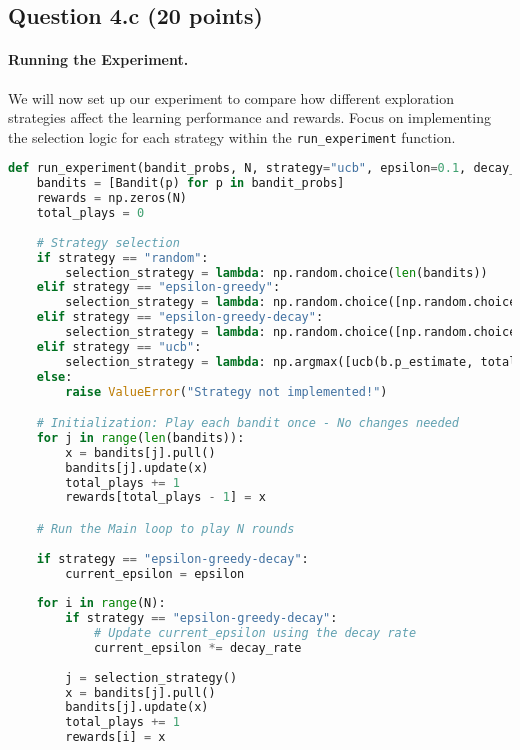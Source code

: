 \documentclass[12pt]{article}
\begin{document}
\subsection*{Question 4.c (20 points) } 
\paragraph{Running the Experiment.}
We will now set up our experiment to compare how different exploration strategies affect the learning performance and rewards. Focus on implementing the selection logic for each strategy within the \texttt{run\_experiment} function.
\begin{solution}
\begin{lstlisting}[language=Python]
def run_experiment(bandit_probs, N, strategy="ucb", epsilon=0.1, decay_rate=0.99):
    bandits = [Bandit(p) for p in bandit_probs]
    rewards = np.zeros(N)
    total_plays = 0
    
    # Strategy selection
    if strategy == "random":
        selection_strategy = lambda: np.random.choice(len(bandits))
    elif strategy == "epsilon-greedy":
        selection_strategy = lambda: np.random.choice([np.random.choice(len(bandits)), np.argmax([b.p_estimate for b in bandits])], p=[epsilon, 1-epsilon])
    elif strategy == "epsilon-greedy-decay":
        selection_strategy = lambda: np.random.choice([np.random.choice(len(bandits)), np.argmax([b.p_estimate for b in bandits])], p=[current_epsilon, 1-current_epsilon]) if np.random.random() < current_epsilon else np.argmax([b.p_estimate for b in bandits])
    elif strategy == "ucb":
        selection_strategy = lambda: np.argmax([ucb(b.p_estimate, total_plays, b.N) for b in bandits])
    else:
        raise ValueError("Strategy not implemented!")

    # Initialization: Play each bandit once - No changes needed
    for j in range(len(bandits)):
        x = bandits[j].pull()
        bandits[j].update(x)
        total_plays += 1
        rewards[total_plays - 1] = x

    # Run the Main loop to play N rounds 
    
    if strategy == "epsilon-greedy-decay":
        current_epsilon = epsilon
    
    for i in range(N):
        if strategy == "epsilon-greedy-decay":
            # Update current_epsilon using the decay rate
            current_epsilon *= decay_rate
        
        j = selection_strategy()
        x = bandits[j].pull()
        bandits[j].update(x)
        total_plays += 1
        rewards[i] = x


\end{lstlisting}
\end{solution}
\end{document}
